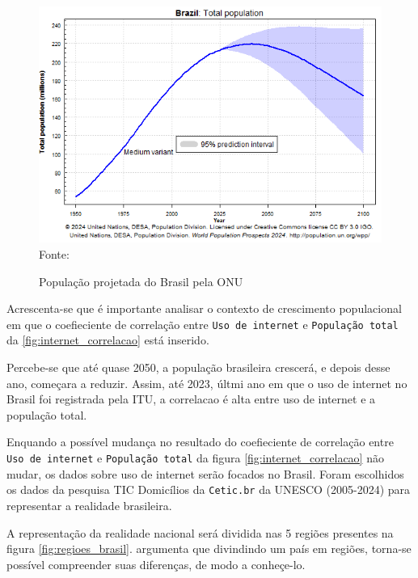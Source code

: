 \begin{figure}[ht]
    \centering
    \caption{População projetada do Brasil pela ONU}
    \includegraphics[width=1\linewidth]{figuras/populacao/populacao_brasil.png}
    \label{fig:populacao_brasil}
    \footnotesize{Fonte: \cite{ONU_populacao_brasil}}
\end{figure}

\newpage
Acrescenta-se que é importante analisar o contexto de crescimento populacional em que o coefieciente de correlação entre \texttt{Uso de internet} e \texttt{População total} da \ref{fig:internet_correlacao} está inserido. 

Percebe-se que até quase 2050, a população brasileira crescerá, e depois desse ano, começara a reduzir. Assim, até 2023, últmi ano em que o uso de internet no Brasil foi registrada pela ITU, a correlacao é alta entre uso de internet e a população total.

Enquando a possível mudança no resultado do coefieciente de correlação entre \texttt{Uso de internet} e \texttt{População total} da figura \ref{fig:internet_correlacao} não mudar, os dados sobre uso de internet serão focados no Brasil. Foram escolhidos os dados da pesquisa TIC Domicílios da \texttt{Cetic.br} da UNESCO (2005-2024) para representar a realidade brasileira. 

A representação da realidade nacional será dividida nas 5 regiões presentes na figura \ref{fig:regioes_brasil}. \cite{HAMAM_Cinco_2017} argumenta que divindindo um país em regiões, torna-se possível compreender suas diferenças, de modo a conheçe-lo.

